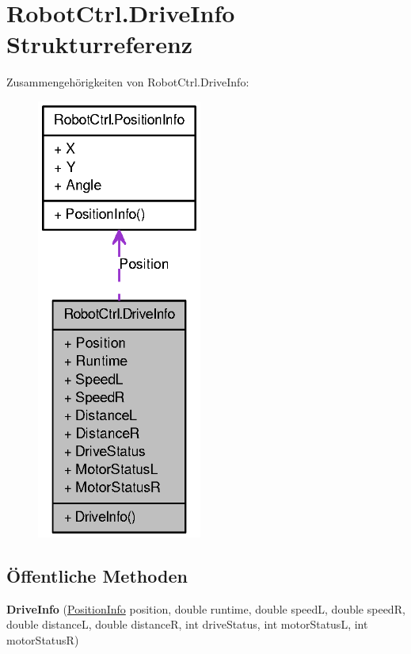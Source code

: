\hypertarget{struct_robot_ctrl_1_1_drive_info}{
\section{RobotCtrl.DriveInfo Strukturreferenz}
\label{struct_robot_ctrl_1_1_drive_info}
}


Zusammengehörigkeiten von RobotCtrl.DriveInfo:\nopagebreak
\begin{figure}[H]
\begin{center}
\leavevmode
\includegraphics[width=154pt]{struct_robot_ctrl_1_1_drive_info__coll__graph}
\end{center}
\end{figure}
\subsection*{Öffentliche Methoden}
\begin{DoxyCompactItemize}
\item 
\hypertarget{struct_robot_ctrl_1_1_drive_info_a99d9fbb5a1b22a902112898282d68029}{
{\bfseries DriveInfo} (\hyperlink{struct_robot_ctrl_1_1_position_info}{PositionInfo} position, double runtime, double speedL, double speedR, double distanceL, double distanceR, int driveStatus, int motorStatusL, int motorStatusR)}
\label{struct_robot_ctrl_1_1_drive_info_a99d9fbb5a1b22a902112898282d68029}

\end{DoxyCompactItemize}
